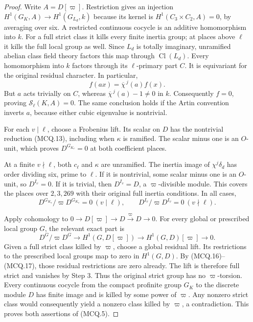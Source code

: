 \begin{proof}
Write $A=D[\varpi]$.  Restriction gives an injection
$H^1(G_K,A)\to H^1(G_{L_d},k)$ because its kernel is
$H^1(C_3\times C_2,A)=0$, by averaging over six.
A restricted continuous cocycle is an additive homomorphism
into $k$.  For a full strict class it kills every finite
inertia group; at places above $\ell$ it kills the full
local group as well.  Since $L_d$ is totally imaginary,
unramified abelian class field theory factors this map
through $\operatorname{Cl}(L_d)$.  Every homomorphism into $k$
factors through its $\ell$-primary part $C$.  It is equivariant
for the original residual character.  In particular,
\[
        f(a x)=\overline\chi^{\,j}(a) f(x).
 \tag{MCQ.15}
\]
But $a$ acts trivially on $C$, whereas
$\overline\chi^{\,j}(a)-1\ne0$ in $k$.
Consequently $f=0$, proving $\mathcal S_\ell(K,A)=0$.
The same conclusion holds if the Artin convention inverts
$a$, because either cubic eigenvalue is nontrivial.

For each $v\mid\ell$, choose a Frobenius lift.  Its scalar
on $D$ has the nontrivial reduction (MCQ.13), including when
$\kappa$ is ramified.  The scalar minus one is an $O$-unit,
which proves $D^{G_{K_v}}=0$ at both coefficient places.

At a finite $v\nmid\ell$, both $c_\ell$ and $\kappa$ are
unramified.  The inertia image of $\chi^j\delta_d$ has order
dividing six, prime to $\ell$.  If it is nontrivial, some
scalar minus one is an $O$-unit, so $D^{I_v}=0$.
If it is trivial, then $D^{I_v}=D$, a $\varpi$-divisible module.
This covers the places over $2,3,269$ with their original
full inertia conditions.  In all cases,
\[
 D^{G_{K_v}}/\varpi D^{G_{K_v}}=0\ (v\mid\ell),
 \qquad D^{I_v}/\varpi D^{I_v}=0\ (v\nmid\ell).
 \tag{MCQ.16}
\]

Apply cohomology to
$0\to D[\varpi]\to D\xrightarrow{\varpi}D\to0$.
For every global or prescribed local group $G$, the relevant
exact part is
\[
 D^G/\varpi D^G\longrightarrow H^1(G,D[\varpi])
             \longrightarrow H^1(G,D)[\varpi]\longrightarrow0.
 \tag{MCQ.17}
\]
Given a full strict class killed by $\varpi$, choose a global
residual lift.  Its restrictions to the prescribed local
groups map to zero in $H^1(G,D)$.  By (MCQ.16)--(MCQ.17),
those residual restrictions are zero already.  The lift is
therefore full strict and vanishes by Step 3.  Thus the
original strict group has no $\varpi$-torsion.
Every continuous cocycle from the compact profinite group
$G_K$ to the discrete module $D$ has finite image and is
killed by some power of $\varpi$.  Any nonzero strict class
would consequently yield a nonzero class killed by $\varpi$,
a contradiction.  This proves both assertions of (MCQ.5).


\end{proof}
